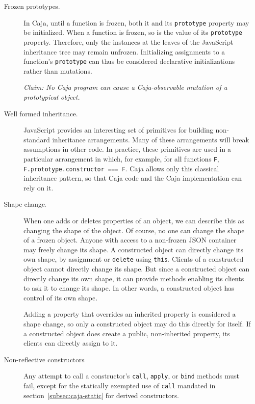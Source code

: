 \documentclass[letterpaper,twocolumn,10pt]{article}
\newcommand{\code}[1]{{\tt {#1}}}              %
\begin{document}
\begin{description}

  \item[Frozen prototypes.] In Caja, until a function is frozen, both it and 
  its \code{prototype} property may be initialized. When a 
  function is frozen, so is the value of its \code{prototype} property. 
  Therefore, only the instances at the leaves of the JavaScript inheritance 
  tree may remain unfrozen. Initializing 
  assignments to a function's \code{prototype} can thus be considered declarative initializations rather than 
  mutations.
  
  \emph{Claim: No Caja program can cause a Caja-observable mutation of a 
  prototypical object.}
  
   \item[Well formed inheritance.] JavaScript provides an interesting set of 
   primitives for building non-standard inheritance arrangements. Many of 
   these arrangements will break assumptions in other code. In practice, 
   these primitives are used in a particular arrangement in which, for 
   example, for all functions \code{F}, \code{F.prototype.constructor === F}. 
   Caja allows only this classical inheritance pattern, so that Caja code and 
   the Caja implementation can rely on it.
   
   \item[Shape change.] When one adds or deletes properties of an object, we 
   can describe this as changing the shape of the object. Of course, no one 
   can change the shape of a frozen object. Anyone with access to a 
   non-frozen JSON container may freely change its shape. A constructed 
   object can directly change its own shape, by assignment or \code{delete} 
   using \code{this}. Clients of a constructed object cannot directly change 
   its shape. But since a constructed object can directly change its own 
   shape, it can provide methods enabling its clients to ask it to change its 
   shape. In other words, a constructed object has control of its own shape.
   
   Adding a property that overrides an inherited property is considered a 
   shape change, so only a constructed object may do this directly for 
   itself. If a constructed object does create a public, non-inherited property, 
   its clients can directly assign to it.
   
   \item[Non-reflective constructors] Any attempt to call a constructor's 
   \code{call}, \code{apply}, or \code{bind} methods must fail, except for 
   the statically exempted use of \code{call} mandated in section~\ref{subsec:caja-static} for derived 
   constructors.
   

\end{description}
\end{document}
